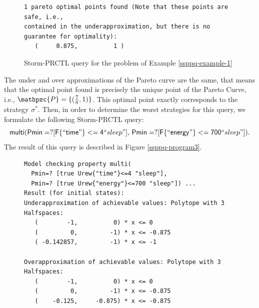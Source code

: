 \begin{example}
\begin{figure}[h!]
{\begin{verbatim}
1 pareto optimal points found (Note that these points are safe, i.e.,
contained in the underapproximation, but there is no guarantee for optimality):
   (     0.875,          1 )
  \end{verbatim}
  }
    \vspace{-2em}
    \caption{Storm-PRCTL query for the \SSPPQ{} problem of Example \ref{ssppq-example-1}}
    \label{ssppq-program2}
  \end{figure}
  The under and over approximations of the Pareto curve are the same, that means that the optimal point found is precisely the unique point of the Pareto Curve, i.e., $\mathpzc{P} = \{ (\frac{7}{8}, 1)\}$.
  This optimal point exactly corresponds to the strategy $\sigma^*$.
  Then, in order to determine the worst strategies for this query, we formulate the following Storm-PRCTL query:
  \[\mathsf{multi(Pmin = ? [F\{``time"\}<=4}``sleep"\mathsf{], \, Pmin=?[F\{``energy"\}<=700}``sleep"\mathsf{])}.
  \]
  The result of this query is described in Figure \ref{ssppq-program3}.
\begin{figure}
  {
  \footnotesize
  \begin{verbatim}
Model checking property multi(
  Pmin=? [true Urew{"time"}<=4 "sleep"],
  Pmin=? [true Urew{"energy"}<=700 "sleep"]) ...
Result (for initial states):
Underapproximation of achievable values: Polytope with 3 Halfspaces:
   (        -1,          0) * x <= 0
   (         0,         -1) * x <= -0.875
   ( -0.142857,         -1) * x <= -1

Overapproximation of achievable values: Polytope with 3 Halfspaces:
   (        -1,          0) * x <= 0
   (         0,         -1) * x <= -0.875
   (    -0.125,     -0.875) * x <= -0.875


\end{verbatim}}
\end{figure}
\end{example}
